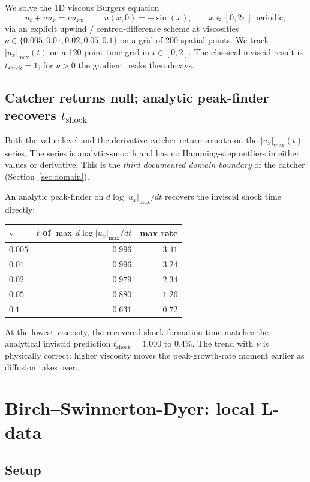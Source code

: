 \documentclass[11pt,letterpaper]{article}
\begin{document}
We solve the 1D viscous Burgers equation
\[
u_t + u u_x = \nu u_{xx}, \qquad u(x,0) = -\sin(x), \qquad x \in [0, 2\pi]\ \mathrm{periodic},
\]
via an explicit upwind / centred-difference scheme at viscosities $\nu \in \{0.005, 0.01, 0.02, 0.05, 0.1\}$ on a grid of 200 spatial points. We track $|u_x|_{\max}(t)$ on a 120-point time grid in $t \in [0, 2]$. The classical inviscid result is $t_{\mathrm{shock}} = 1$; for $\nu > 0$ the gradient peaks then decays.

\subsection{Catcher returns null; analytic peak-finder recovers $t_{\mathrm{shock}}$}

Both the value-level and the derivative catcher return $\mathtt{smooth}$ on the $|u_x|_{\max}(t)$ series. The series is analytic-smooth and has no Hamming-step outliers in either values or derivative. This is the \emph{third documented domain boundary} of the catcher (Section~\ref{sec:domain}).

An analytic peak-finder on $d \log |u_x|_{\max} / dt$ recovers the inviscid shock time directly:
\begin{center}
\begin{tabular}{lrr}
\toprule
$\nu$ & $t$ of $\max\,d\log|u_x|_{\max}/dt$ & max rate \\
\midrule
$0.005$ & $\bm{0.996}$ & $3.41$\\
$0.01$  & $0.996$ & $3.24$\\
$0.02$  & $0.979$ & $2.34$\\
$0.05$  & $0.880$ & $1.26$\\
$0.1$   & $0.631$ & $0.72$\\
\bottomrule
\end{tabular}
\end{center}
At the lowest viscosity, the recovered shock-formation time matches the analytical inviscid prediction $t_{\mathrm{shock}} = 1.000$ to $0.4\%$. The trend with $\nu$ is physically correct: higher viscosity moves the peak-growth-rate moment earlier as diffusion takes over.

\section{Birch--Swinnerton-Dyer: local L-data}\label{sec:bsd}

\subsection{Setup}
\end{document}
